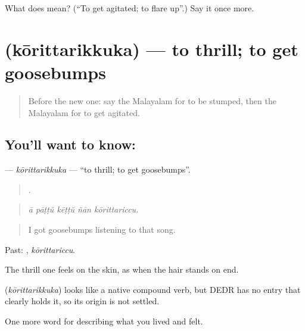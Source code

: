 \begin{tcolorbox}[breakable,colback=teal!4,colframe=teal!35!black,title={Before you move on}]
What does  mean? (\textquotedblleft{}To get agitated; to flare up\textquotedblright{}.) Say it once more.
\end{tcolorbox}
\section[\texorpdfstring{\ml{കോരിത്തരിക്കുക} (kōrittarikkuka)}{കോരിത്തരിക്കുക (kōrittarikkuka)}]{ (kōrittarikkuka) — to thrill; to get goosebumps}

\label{lesson:ML-C526-korittarikkuka}



\begin{quote}
Before the new one: say the Malayalam for to be stumped, then the Malayalam for to get agitated.
\end{quote}

\subsection*{You'll want to know: }
\textbf{} — \emph{kōrittarikkuka} — \textquotedblleft{}to thrill; to get goosebumps\textquotedblright{}.

\begin{quote}
    .
\end{quote}

\begin{quote}
\emph{ā pāṭṭŭ kēṭṭŭ ñān kōrittariccu.}
\end{quote}

\begin{quote}
I got goosebumps listening to that song.
\end{quote}

Past: , \emph{kōrittariccu}.

The thrill one feels on the skin, as when the hair stands on end.

\begin{cousinweb}
\textbf{} (\emph{kōrittarikkuka}) looks like a native compound verb, but DEDR has no entry that clearly holds it, so its origin is not settled.
\end{cousinweb}

\begin{grammarlens}[title={What you've built}]
One more word for describing what you lived and felt.
\end{grammarlens}

